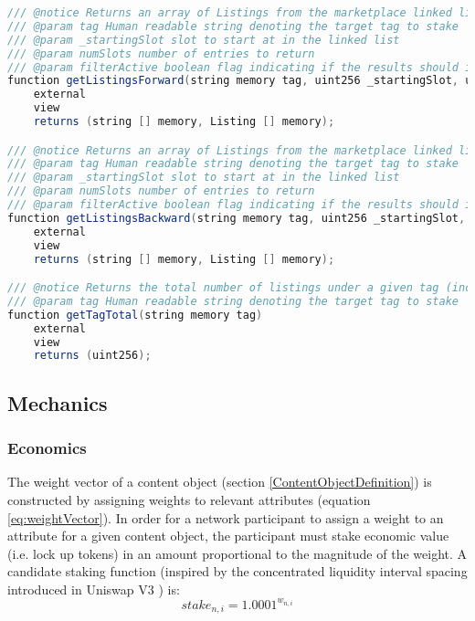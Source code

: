 \begin{lstlisting}[language=Java, caption=a minimal interface for reading and writing to the global ranking namespace]
/// @notice Returns an array of Listings from the marketplace linked list from highest to lowest ranked
/// @param tag Human readable string denoting the target tag to stake
/// @param _startingSlot slot to start at in the linked list
/// @param numSlots number of entries to return
/// @param filterActive boolean flag indicating if the results should include expired listings (false) or not (true)
function getListingsForward(string memory tag, uint256 _startingSlot, uint256 numSlots, bool filterActive) 
    external 
    view 
    returns (string [] memory, Listing [] memory);

/// @notice Returns an array of Listings from the marketplace linked list from lowest to highest ranked
/// @param tag Human readable string denoting the target tag to stake
/// @param _startingSlot slot to start at in the linked list
/// @param numSlots number of entries to return
/// @param filterActive boolean flag indicating if the results should include expired listings (false) or not (true)
function getListingsBackward(string memory tag, uint256 _startingSlot, uint256 numSlots, bool filterActive);
    external 
    view 
    returns (string [] memory, Listing [] memory);

/// @notice Returns the total number of listings under a given tag (including expired listings which have not been removed)
/// @param tag Human readable string denoting the target tag to stake
function getTagTotal(string memory tag)
    external 
    view 
    returns (uint256);
\end{lstlisting}

\subsection{Mechanics}
\label{PrimitiveMechanics}

\subsubsection{Economics}
The weight vector of a content object (section \ref{ContentObjectDefinition}) is constructed by assigning weights to relevant attributes (equation \ref{eq:weightVector}). In order for a network participant to assign a weight to an attribute for a given content object, the participant must stake economic value (i.e. lock up tokens) in an amount proportional to the magnitude of the weight. A candidate staking function (inspired by the concentrated liquidity interval spacing introduced in Uniswap V3 \cite{adams2021uniswap}) is: 
\begin{equation}
\label{eq:stakefunction}
    stake_{n,i} = 1.0001^{w_{n,i}}
\end{equation}

